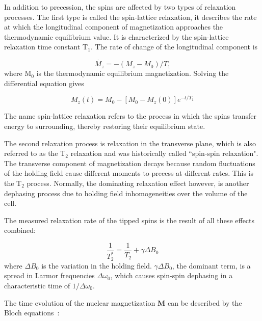In addition to precession, the spins are affected by two types of relaxation processes. The first type is called the spin-lattice relaxation, it describes the rate at which the longitudinal component of magnetization approaches the thermodynamic equilibrium value. It is characterized by the spin-lattice relaxation time constant T$_{1}$. The rate of change of the longitudinal component is

\begin{equation}
\dot{M_{z}}=-(M_{z}-M_{0})/T_{1}
\end{equation}
where M$_{0}$ is the thermodynamic equilibrium magnetization. Solving the differential equation gives

\begin{equation}
M_{z}(t)=M_{0}-\left[M_{0}-M_{z}(0)\right]e^{-t/T_{1}}
\end{equation}

The name spin-lattice relaxation refers to the process in which the spins transfer energy to surrounding, thereby restoring their equilibrium state.

The second relaxation process is relaxation in the transverse plane, which is also referred to as the T$_{2}$ relaxation and was historically called ``spin-spin relaxation". The transverse component of magnetization decays because random fluctuations of the holding field cause different moments to precess at different rates. This is the T$_{2}$ process. Normally, the dominating relaxation effect however, is another dephasing process due to holding field inhomogeneities over the volume of the cell. 

The measured relaxation rate of the tipped spins is the result of all these effects combined:

\begin{equation}
\frac{1}{T_{2}^{*}}=\frac{1}{T_{2}}+\gamma \Delta B_{0}
\end{equation}
where $\Delta B_{0}$ is the variation in the holding field. $\gamma \Delta B_{0}$, the dominant term, is a spread in Larmor frequencies $\Delta \omega_{0}$, which causes spin-spin dephasing in a characteristic time of $1/\Delta \omega_{0}$. 

The time evolution of the nuclear magnetization {\bf M} can be described by the Bloch equations~\cite{PhysRev.70.460}:

